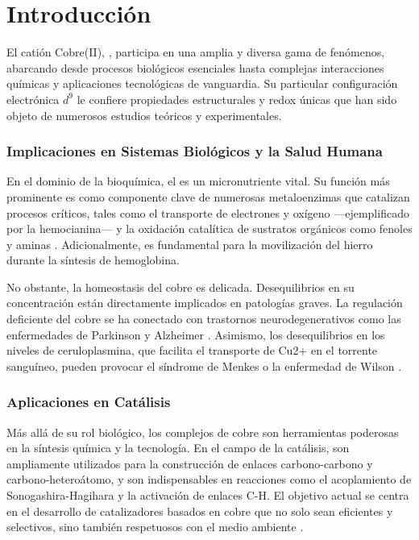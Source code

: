 \chapter{Introducción}

El catión Cobre(II), , participa en una amplia y diversa gama de fenómenos, abarcando desde procesos biológicos esenciales hasta complejas interacciones químicas y aplicaciones tecnológicas de vanguardia. Su particular configuración electrónica $d^9$ le confiere propiedades estructurales y redox únicas que han sido objeto de numerosos estudios teóricos y experimentales.

\subsection*{Implicaciones en Sistemas Biológicos y la Salud Humana}

En el dominio de la bioquímica, el  es un micronutriente vital. Su función más prominente es como componente clave de numerosas metaloenzimas que catalizan procesos críticos, tales como el transporte de electrones y oxígeno —ejemplificado por la hemocianina— y la oxidación catalítica de sustratos orgánicos como fenoles y aminas \cite{Cu-2014-01, Wa-2024-03, Wa-2017-01, Wa-2009-01}. Adicionalmente, es fundamental para la movilización del hierro durante la síntesis de hemoglobina.

No obstante, la homeostasis del cobre es delicada. Desequilibrios en su concentración están directamente implicados en patologías graves. La regulación deficiente del cobre se ha conectado con trastornos neurodegenerativos como las enfermedades de Parkinson y Alzheimer \cite{Cu-2014-02,Cu-2011-02, Cu-2012-01}. Asimismo, los desequilibrios en los niveles de ceruloplasmina, que facilita el transporte de Cu2+ en el torrente sanguíneo, pueden provocar el síndrome de Menkes o la enfermedad de Wilson \cite{Cu-2001-01, Cu-2017-01}.

\subsection*{Aplicaciones en Catálisis}

Más allá de su rol biológico, los complejos de cobre son herramientas poderosas en la síntesis química y la tecnología. En el campo de la catálisis, son ampliamente utilizados para la construcción de enlaces carbono-carbono y carbono-heteroátomo, y son indispensables en reacciones como el acoplamiento de Sonogashira-Hagihara y la activación de enlaces C-H. El objetivo actual se centra en el desarrollo de catalizadores basados en cobre que no solo sean eficientes y selectivos, sino también respetuosos con el medio ambiente \cite{Cu-2014-01}.

